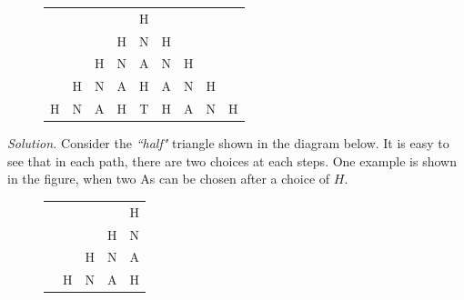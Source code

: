\begin{multicols}{2}
\begin{figure}[H]
		\centering
		\captionsetup{labelformat= empty, justification=centering}
		\renewcommand{\arraystretch}{1.2}
		\begin{tabular}{ccccccccc}
		&   &   &   & H                                                &                                                  &                                                  &   &   \\
		&   &   & H & N                                                & H                                                &                                                  &   &   \\
		&   & H & N & A                                                & \cellcolor{cackithi!40}N & \cellcolor{cackithi!40}H &   &   \\
		& H & N & A & \cellcolor{cackithi!40}H& \cellcolor{cackithi!40}  A  & N                                                & H &   \\
		H & N & A & H & \cellcolor{cackithi!40}T & H                                                & A                                                & N &  H 
	\end{tabular} 
	\vspace*{-10pt}
	\end{figure}
	\textit{Solution.}
	Consider the \textit{``half"} triangle shown in the diagram below.
	It is easy to see that in each path, there are two choices at each steps.
	One example is shown in the figure, when two As can be chosen after a choice of $H$.
	\begin{figure}[H]
	\vspace*{-5pt}
	\centering
	\captionsetup{labelformat= empty, justification=centering}
	\renewcommand{\arraystretch}{1.2}
	\begin{tabular}{ccccl}
		&   &                                                  &                                                  &  H                                                 \\
		&   &                                                  &  H                                                 &  N                                                 \\
		&   &  H                                                 &  N                                                 &  A                                                 \\
		&  H  &  N                                                 & \cellcolor{duongvaotoanhoc!40}  A &  H                                                 \\

\end{tabular}
\end{figure}
\end{multicols}
